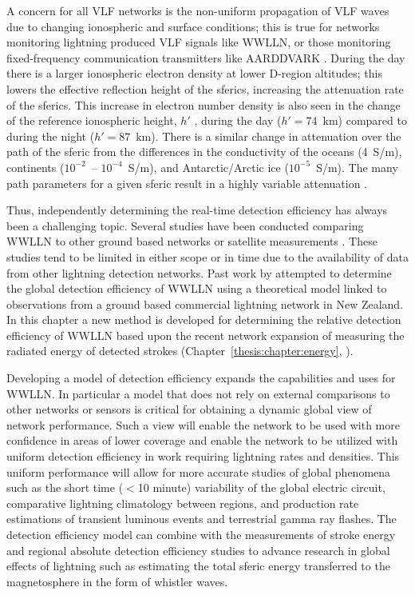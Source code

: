 A concern for all VLF networks is the non-uniform propagation of VLF waves due to changing ionospheric  and surface conditions; this is true for networks monitoring lightning produced VLF signals like WWLLN, or those monitoring fixed-frequency communication transmitters like AARDDVARK \citep{Clilverd2009}.
During the day there is a larger ionospheric electron density at lower D-region altitudes; this lowers the effective reflection height of the sferics, increasing the attenuation rate of the sferics.
This increase in electron number density is also seen in the change of the reference ionospheric height, $h'$ \citep{Wait1960a}, during the day ($h'=74$~km) compared to during the night ($h'=87$~km).
There is a similar change in attenuation over the path of the sferic from the differences in the conductivity of the oceans (4~S/m), continents ($10^{-2}$~-- $10^{-4}$~S/m), and Antarctic/Arctic ice ($10^{-5}$~S/m).
The many path parameters for a given sferic result in a highly variable attenuation \citep{Volland1995}.

Thus, independently determining the real-time detection efficiency has always been a challenging topic.
Several studies have been conducted comparing WWLLN to other ground based networks or satellite measurements \citep{Lay2004b, Jacobson2006c, Rodger2009, Abarca2010, Abreu2010}.
These studies tend to be limited in either scope or in time due to the availability of data from other lightning detection networks.
Past work by \citet{Rodger2006} attempted to determine the global detection efficiency of WWLLN using a theoretical model linked to observations from a ground based commercial lightning network in New Zealand.
In this chapter a new method is developed for determining the relative detection efficiency of WWLLN based upon the recent network expansion of measuring the radiated energy of detected strokes (Chapter~\ref{thesis:chapter:energy}, \citet{Hutchins2012}).

Developing a model of detection efficiency expands the capabilities and uses for WWLLN.
In particular a model that does not rely on external comparisons to other networks or sensors is critical for obtaining a dynamic global view of network performance.
Such a view will enable the network to be used with more confidence in areas of lower coverage and enable the network to be utilized with uniform detection efficiency in work requiring lightning rates and densities.
This uniform performance will allow for more accurate studies of global phenomena such as the short time ($<$10 minute) variability of the global electric circuit, comparative lightning climatology between regions, and production rate estimations of transient luminous events and terrestrial gamma ray flashes.
The detection efficiency model can combine with the measurements of stroke energy and regional absolute detection efficiency studies to advance research in global effects of lightning such as estimating the total sferic energy transferred to the magnetosphere in the form of whistler waves.

